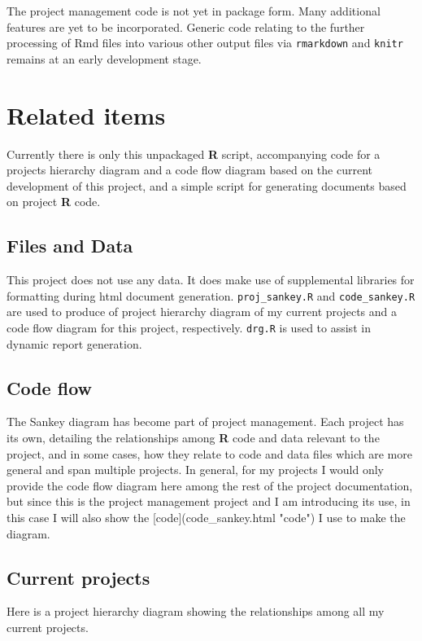 \documentclass{article}\usepackage[]{graphicx}\usepackage[]{color}
\makeatletter
\newenvironment{kframe}{%
 \def\at@end@of@kframe{}%
 \ifinner\ifhmode%
  \def\at@end@of@kframe{\end{minipage}}%
  \begin{minipage}{\columnwidth}%
 \fi\fi%
 \def\FrameCommand##1{\hskip\@totalleftmargin \hskip-\fboxsep
 \colorbox{shadecolor}{##1}\hskip-\fboxsep
     \hskip-\linewidth \hskip-\@totalleftmargin \hskip\columnwidth}%
 \MakeFramed {\advance\hsize-\width
   \@totalleftmargin\z@ \linewidth\hsize
   \@setminipage}}%
 {\par\unskip\endMakeFramed%
 \at@end@of@kframe}
\makeatother
\begin{document}
The project management code is not yet in package form.
Many additional features are yet to be incorporated.
Generic code relating to the further processing of Rmd files into various other output files via \texttt{rmarkdown} and \texttt{knitr} remains at an early development stage.

\section{Related items}
Currently there is only this unpackaged \textbf{R} script, accompanying code for a projects hierarchy diagram
and a code flow diagram based on the current development of this project, and a simple script for generating documents based on project \textbf{R} code.

\subsection{Files and Data}
This project does not use any data.
It does make use of supplemental libraries for formatting during html document generation.
\texttt{proj\_sankey.R} and \texttt{code\_sankey.R} are used to produce of project hierarchy diagram of my current projects and a code flow diagram for this project, respectively.
\texttt{drg.R} is used to assist in dynamic report generation.

\subsection{Code flow}
The Sankey diagram has become part of project management.
Each project has its own, detailing the relationships among \textbf{R} code and data relevant to the project,
and in some cases, how they relate to code and data files which are more general and span multiple projects.
In general, for my projects I would only provide the code flow diagram here among the rest of the project documentation,
but since this is the project management project and I am introducing its use,
in this case I will also show the [code](code\_sankey.html "code") I use to make the diagram.

\subsection{Current projects}
Here is a project hierarchy diagram showing the relationships among all my current projects.



\begin{kframe}


{\ttfamily\noindent\bfseries\color{errorcolor}{Error in eval(expr, envir, enclos): object 'p' not found}}\end{kframe}
\end{document}
